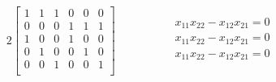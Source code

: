 \documentclass{article}
\begin{document}
\begin{alignat*}{2}
    \begin{bmatrix}
       1 & 1 & 1 & 0 & 0 & 0\\
       0 & 0 & 0 & 1 & 1 & 1\\
       1 & 0 & 0 & 1 & 0 & 0\\
       0 & 1 & 0 & 0 & 1 & 0\\
       0 & 0 & 1 & 0 & 0 & 1\\
           \end{bmatrix}
        & \hspace{ 4em}%
      \begin{matrix} x_{11}x_{22}-x_{12}x_{21}=0 \\
      x_{11}x_{22}-x_{12}x_{21}=0 \\
      x_{11}x_{22}-x_{12}x_{21}=0 \\
     \end{matrix}
    \end{alignat*}
    \vskip1cm
\end{document}

